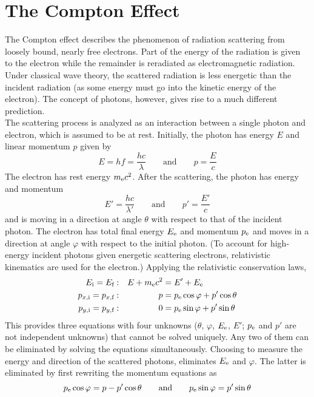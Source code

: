 \documentclass{subfiles}
\begin{document}
	\section{The Compton Effect}
		The Compton effect describes the phenomenon of radiation scattering from loosely bound, nearly free electrons. Part of the energy of the radiation is given to the electron while the remainder is reradiated as electromagnetic radiation. Under classical wave theory, the scattered radiation is less energetic than the incident radiation (as some energy must go into the kinetic energy of the electron). The concept of photons, however, gives rise to a much different prediction. \\
			The scattering process is analyzed as an interaction between a single photon and electron, which is assumed to be at rest. Initially, the photon has energy \(E\) and linear momentum \(p\) given by
			\[E = hf = \frac{hc}{\lambda} \qquad \text{and} \qquad p = \frac{E}{c}\]
			The electron has rest energy \(m_{\text{e}}c^2\). After the scattering, the photon has energy and momentum 
			\[E' = \frac{hc}{\lambda'} \qquad \text{and} \qquad p' = \frac{E'}{c}\]
			and is moving in a direction at angle \(\theta\) with respect to that of the incident photon. The electron has total final energy \(E_{\text{e}}\) and momentum \(p_{\text{e}}\) and moves in a direction at angle \(\varphi\) with respect to the initial photon. (To account for high-energy incident photons given energetic scattering electrons, relativistic kinematics are used for the electron.) Applying the relativistic conservation laws,
			\begin{align*}
				E_{\text{i}} = E_{\text{f}} &: &
					E + m_{\text{e}}c^2 &= E' + E_{\text{e}} \\
				p_{x, \text{i}} = p_{x, \text{f}} &: &
					p &= p_{\text{e}}\cos\varphi + p'\cos\theta \\
				p_{y, \text{i}} = p_{y, \text{f}} &: &
					0 &= p_{\text{e}}\sin\varphi + p'\sin\theta	
			\end{align*}
			This provides three equations with four unknowns (\(\theta\), \(\varphi\), \(E_{\text{e}}\), \(E'\); \(p_{\text{e}}\) and \(p'\) are not independent unknowns) that cannot be solved uniquely. Any two of them can be eliminated by solving the equations simultaneously. Choosing to measure the energy and direction of the scattered photons, eliminates \(E_{\text{e}}\) and \(\varphi\). The latter is eliminated by first rewriting the momentum equations as
				\[
					p_{\text{e}}\cos\varphi = p - p'\cos\theta \qquad \text{and} \qquad
					p_{\text{e}}\sin\varphi = p'\sin\theta
				\]
\end{document}
